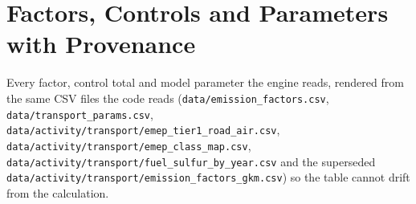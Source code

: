 \section{Factors, Controls and Parameters with Provenance}
\label{app:factors}

Every factor, control total and model parameter the engine reads, rendered
from the same CSV files the code reads (\texttt{data/emission\_factors.csv},
\texttt{data/transport\_params.csv},
\texttt{data/activity/transport/emep\_tier1\_road\_air.csv},
\texttt{data/activity/transport/emep\_class\_map.csv},
\texttt{data/activity/transport/fuel\_sulfur\_by\_year.csv} and the
superseded \texttt{data/activity/transport/emission\_factors\_gkm.csv}) so the table
cannot drift from the calculation.

